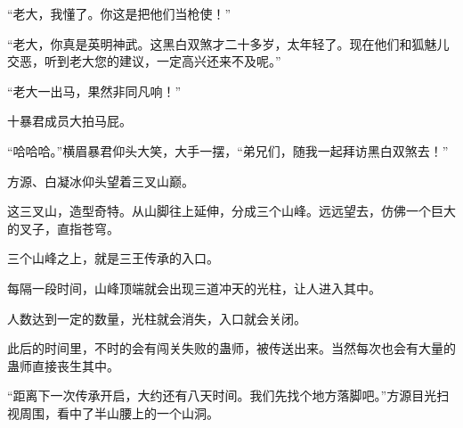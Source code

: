 \begin{this_body}
“老大，我懂了。你这是把他们当枪使！”

“老大，你真是英明神武。这黑白双煞才二十多岁，太年轻了。现在他们和狐魅儿交恶，听到老大您的建议，一定高兴还来不及呢。”

“老大一出马，果然非同凡响！”

十暴君成员大拍马屁。

“哈哈哈。”横眉暴君仰头大笑，大手一摆，“弟兄们，随我一起拜访黑白双煞去！”

方源、白凝冰仰头望着三叉山巅。

这三叉山，造型奇特。从山脚往上延伸，分成三个山峰。远远望去，仿佛一个巨大的叉子，直指苍穹。

三个山峰之上，就是三王传承的入口。

每隔一段时间，山峰顶端就会出现三道冲天的光柱，让人进入其中。

人数达到一定的数量，光柱就会消失，入口就会关闭。

此后的时间里，不时的会有闯关失败的蛊师，被传送出来。当然每次也会有大量的蛊师直接丧生其中。

“距离下一次传承开启，大约还有八天时间。我们先找个地方落脚吧。”方源目光扫视周围，看中了半山腰上的一个山洞。

\end{this_body}

